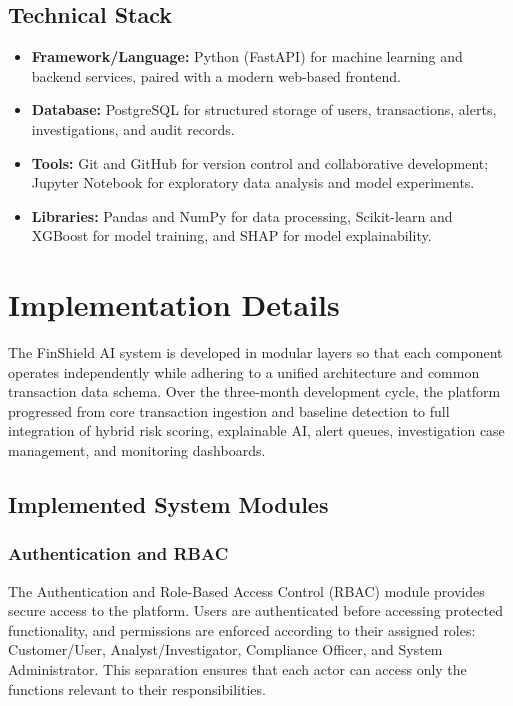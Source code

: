 \documentclass{tietreport}
\begin{document}
\subsection{Technical Stack}

\begin{itemize}
  \item \textbf{Framework/Language:} Python (FastAPI) for machine learning and
    backend services, paired with a modern web-based frontend.
  \item \textbf{Database:} PostgreSQL for structured storage of users,
    transactions, alerts, investigations, and audit records.
  \item \textbf{Tools:} Git and GitHub for version control and collaborative
    development; Jupyter Notebook for exploratory data analysis and model experiments.
  \item \textbf{Libraries:} Pandas and NumPy for data processing, Scikit-learn
    and XGBoost for model training, and SHAP for model explainability.
\end{itemize}

\section{Implementation Details}

The FinShield AI system is developed in modular layers so that each
component operates independently while adhering to a unified architecture
and common transaction data schema. Over the three-month development cycle,
the platform progressed from core transaction ingestion and baseline detection
to full integration of hybrid risk scoring, explainable AI, alert queues,
investigation case management, and monitoring dashboards.

\subsection{Implemented System Modules}

\subsubsection*{Authentication and RBAC}

The Authentication and Role-Based Access Control (RBAC) module provides
secure access to the platform. Users are authenticated before accessing
protected functionality, and permissions are enforced according to their
assigned roles: Customer/User, Analyst/Investigator, Compliance Officer,
and System Administrator. This separation ensures that each actor can
access only the functions relevant to their responsibilities.
\end{document}
